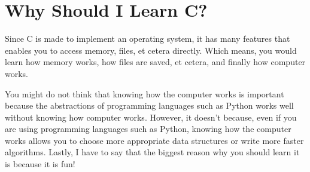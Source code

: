 \section{Why Should I Learn C?}

Since C is made to implement an operating system, it has many features
that enables you to access memory, files, et cetera directly. Which means,
you would learn how memory works, how files are saved, et cetera, and
finally how computer works.

You might do not think that knowing how the computer works is important
because the abstractions of programming languages such as Python works
well without knowing how computer works. However, it doesn't because, even
if you are using programming languages such as Python, knowing how the
computer works allows you to choose more appropriate data structures or
write more faster algorithms. Lastly, I have to say that the biggest
reason why you should learn it is because it is fun!
